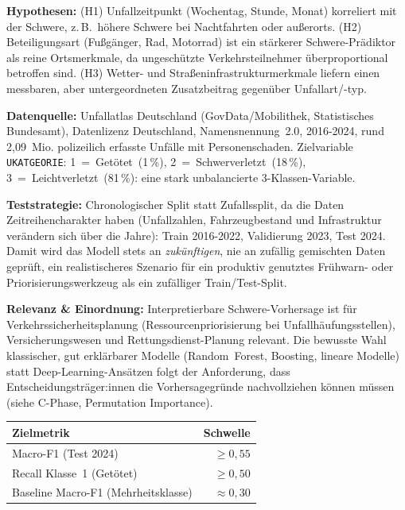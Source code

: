\documentclass[11pt,a4paper]{article}
\newcommand{\code}[1]{\texttt{\small #1}}
\begin{document}
\textbf{Hypothesen:} (H1) Unfallzeitpunkt (Wochentag, Stunde, Monat)
korreliert mit der Schwere, z.\,B.\ höhere Schwere bei Nachtfahrten
oder außerorts. (H2) Beteiligungsart (Fußgänger, Rad, Motorrad) ist ein
stärkerer Schwere-Prädiktor als reine Ortsmerkmale, da ungeschützte
Verkehrsteilnehmer überproportional betroffen sind. (H3) Wetter- und
Straßeninfrastrukturmerkmale liefern einen messbaren, aber
untergeordneten Zusatzbeitrag gegenüber Unfallart/-typ.

\textbf{Datenquelle:} Unfallatlas Deutschland (GovData/Mobilithek,
Statistisches Bundesamt), Datenlizenz Deutschland, Namensnennung~2.0,
2016-2024, rund 2{,}09~Mio. polizeilich erfasste Unfälle mit
Personenschaden. Zielvariable \code{UKATGEORIE}: 1~=~Getötet~(1\,\%),
2~=~Schwerverletzt~(18\,\%), 3~=~Leichtverletzt~(81\,\%): eine stark
unbalancierte 3-Klassen-Variable.

\textbf{Teststrategie:} Chronologischer Split statt Zufallssplit, da die
Daten Zeitreihencharakter haben (Unfallzahlen, Fahrzeugbestand und
Infrastruktur verändern sich über die Jahre): Train 2016-2022,
Validierung 2023, Test 2024. Damit wird das Modell stets an
\emph{zukünftigen}, nie an zufällig gemischten Daten geprüft, ein
realistischeres Szenario für ein produktiv genutztes Frühwarn- oder
Priorisierungswerkzeug als ein zufälliger Train/Test-Split.

\textbf{Relevanz \& Einordnung:} Interpretierbare Schwere-Vorhersage
ist für Verkehrssicherheitsplanung (Ressourcenpriorisierung bei
Unfallhäufungsstellen), Versicherungswesen und Rettungsdienst-Planung
relevant. Die bewusste Wahl klassischer, gut erklärbarer Modelle
(Random~Forest, Boosting, lineare Modelle) statt Deep-Learning-Ansätzen
folgt der Anforderung, dass Entscheidungsträger:innen die
Vorhersagegründe nachvollziehen können müssen (siehe C-Phase,
Permutation Importance).

\begin{center}
\small
\begin{tabularx}{\linewidth}{Yr}
\toprule
\textbf{Zielmetrik} & \textbf{Schwelle} \\
\midrule
Macro-F1 (Test 2024) & $\geq 0{,}55$ \\
Recall Klasse~1 (Getötet) & $\geq 0{,}50$ \\
Baseline Macro-F1 (Mehrheitsklasse) & $\approx 0{,}30$ \\
\bottomrule
\end{tabularx}
\end{center}

\clearpage
\end{document}
